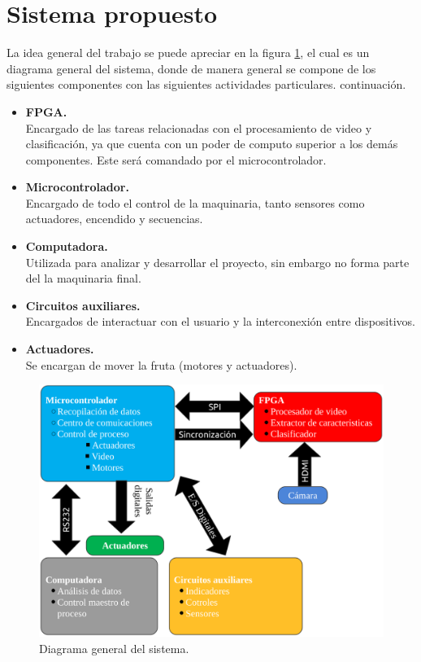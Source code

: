 \documentclass[twoside,spanish,ESP,MSc]{plantillaLabUPV}
\theoremstyle{definition}
\begin{document}
\section{Sistema propuesto}
La idea general del trabajo se puede apreciar en la figura \ref{sis}, el cual es un diagrama general del sistema, donde de manera general se compone de los siguientes componentes con las siguientes actividades particulares. continuación.

\begin{itemize}
	\item \textbf{FPGA.}\\ Encargado de las tareas relacionadas con el procesamiento de video y clasificación, ya que cuenta con un poder de computo superior a los demás componentes. Este será comandado por el microcontrolador.
	\item \textbf{Microcontrolador.}\\ Encargado de todo el control de la maquinaria, tanto sensores como actuadores, encendido y secuencias. 
	\item \textbf{Computadora.}\\ Utilizada para analizar y desarrollar el proyecto, sin embargo no forma parte del la maquinaria final.
	\item \textbf{Circuitos auxiliares.} \\Encargados de interactuar con el usuario y la interconexión entre dispositivos.
	\item \textbf{Actuadores.}\\ Se encargan de mover la fruta (motores y actuadores).
\end{itemize}


\begin{figure}[h]
	\centering
	\includegraphics*[scale=0.5]{sis} 
	\caption{Diagrama general del sistema.}
	\label{sis}
\end{figure}
\end{document}
